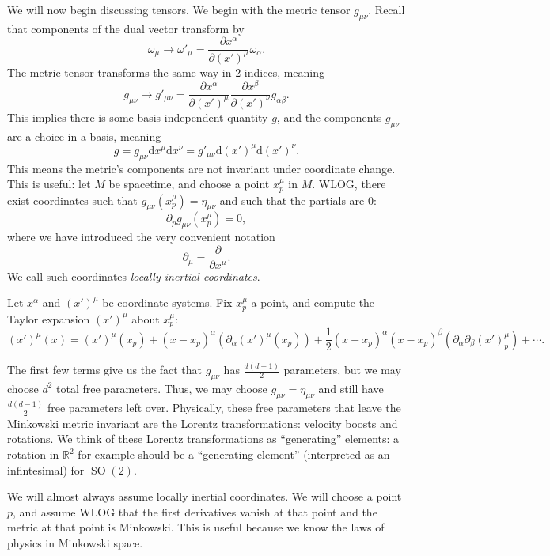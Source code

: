 
We will now begin discussing tensors. We begin with the metric tensor $g_{\mu \nu } $. Recall that components of the dual vector transform by
\[
	\omega _\mu \to \omega '_\mu =\frac{\partial x^\alpha }{\partial (x')^\mu } \omega _\alpha 
.\]
The metric tensor transforms the same way in 2 indices, meaning
\[
	g_{\mu \nu } \to g'_{\mu \nu } =\frac{\partial x^\alpha }{\partial (x')^\mu } \frac{\partial x^\beta }{\partial (x')^\nu } g_{\alpha \beta } 
.\]
This implies there is some basis independent quantity $g$, and the components $g_{\mu \nu } $ are a choice in a basis, meaning
\[
	g=g_{\mu \nu } \mathrm{d}  x^\mu \mathrm{d}  x^\nu =g'_{\mu \nu } \mathrm{d} (x')^\mu \mathrm{d} (x')^\nu 
.\]
This means the metric's components are not invariant under coordinate change. This is useful: let $M$ be spacetime, and choose a point $x^\mu _p$ in $M$. WLOG, there exist coordinates such that $g_{\mu \nu } (x^\mu_p)=\eta_{\mu \nu } $ and such that the partials are 0:
\[
	\partial_p g_{\mu \nu } (x^\mu _p)=0
,\]
where we have introduced the very convenient notation
\[
	\partial _\mu =\frac{\partial }{\partial x^\mu } 
.\]
We call such coordinates \emph{locally inertial coordinates}.

Let $x^\alpha$ and $(x')^\mu $ be coordinate systems. Fix $x^\mu _p$ a point, and compute the Taylor expansion $(x')^\mu $ about $x_p^\mu $:
\[
	(x')^\mu (x)=(x')^\mu (x_p)+(x-x_p)^\alpha (\partial_\alpha (x')^\mu (x_p))+\frac{1}{2} (x-x_p)^\alpha (x-x_p)^\beta (\partial _\alpha \partial _\beta (x')^\mu _p)+\cdots
.\]

The first few terms give us the fact that $g_{\mu \nu } $ has $\frac{d(d+1)}{2} $ parameters, but we may choose $d^2 $ total free parameters. Thus, we may choose $g_{\mu \nu } =\eta _{\mu \nu } $ and still have $\frac{d(d-1)}{2} $ free parameters left over. Physically, these free parameters that leave the Minkowski metric invariant are the Lorentz transformations: velocity boosts and rotations. We think of these Lorentz transformations as ``generating'' elements: a rotation in $\mathbb{R} ^2$ for example should be a ``generating element'' (interpreted as an infintesimal) for $\operatorname{SO} (2)$.

We will almost always assume locally inertial coordinates. We will choose a point $p$, and assume WLOG that the first derivatives vanish at that point and the metric at that point is Minkowski. This is useful because we know the laws of physics in Minkowski space.

